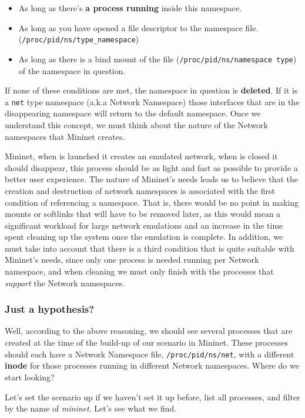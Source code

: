 \documentclass[12pt]{article}
\newcommand{\newpar} {
    \vskip 1cm
}
\begin{document}
			\begin{itemize}
				\item As long as there's \textbf{a process running} inside this namespace.
				\item As long as you have opened a file descriptor to the namespace file. (\texttt{/proc/{pid}/ns/{type\_namespace}})
				\item As long as there is a bind mount of the file (\texttt{/proc/{pid}/ns/{namespace type}}) of the namespace in question.
			\end{itemize}

			If none of these conditions are met, the namespace in question is \textbf{deleted}. If it is a \texttt{net} type namespace (a.k.a Network Namespace) those interfaces that are in the disappearing namespace will return to the default namespace. Once we understand this concept, we must think about the nature of the Network namespaces that Mininet creates.
			\newpar
			Mininet, when is launched it creates an emulated network, when is closed it should disappear, this process should be as light and fast as possible to provide a better user experience. The nature of Mininet's needs leads us to believe that the creation and destruction of network namespaces is associated with the first condition of referencing a namespace. That is, there would be no point in making mounts or softlinks that will have to be removed later, as this would mean a significant workload for large network emulations and an increase in the time spent cleaning up the system once the emulation is complete. In addition, we must take into account that there is a third condition that is quite suitable with Mininet's needs, since only one process is needed running per Network namespace, and when cleaning we must only finish with the processes that \textit{support} the Network namespaces.

		\subsubsection{Just a hypothesis?}
			Well, according to the above reasoning, we should see several processes that are created at the time of the build-up of our scenario in Mininet. These processes should each have a Network Namespace file, \texttt{/proc/{pid}/ns/net}, with a different \textbf{inode} for those processes running in different Network namespaces. Where do we start looking?

			Let's set the scenario up if we haven't set it up before, list all processes, and filter by the name of \textit{mininet}. Let's see what we find.
\end{document}
